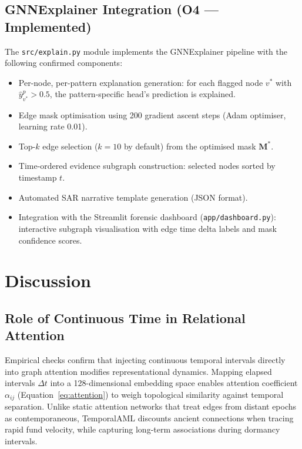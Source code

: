 \subsection{GNNExplainer Integration (O4 — Implemented)}

The \texttt{src/explain.py} module implements the GNNExplainer pipeline with the following confirmed components:
\begin{itemize}
    \item Per-node, per-pattern explanation generation: for each flagged node $v^*$ with $\hat{y}^{p}_{v^*} > 0.5$, the pattern-specific head's prediction is explained.
    \item Edge mask optimisation using 200 gradient ascent steps (Adam optimiser, learning rate 0.01).
    \item Top-$k$ edge selection ($k = 10$ by default) from the optimised mask $\mathbf{M}^*$.
    \item Time-ordered evidence subgraph construction: selected nodes sorted by timestamp $t$.
    \item Automated SAR narrative template generation (JSON format).
    \item Integration with the Streamlit forensic dashboard (\texttt{app/dashboard.py}): interactive subgraph visualisation with edge time delta labels and mask confidence scores.
\end{itemize}


\section{Discussion}
\label{sec:discussion}

\subsection{Role of Continuous Time in Relational Attention}

Empirical checks confirm that injecting continuous temporal intervals directly into graph attention modifies representational dynamics. Mapping elapsed intervals $\Delta t$ into a 128-dimensional embedding space enables attention coefficient $\alpha_{ij}$ (Equation~\ref{eq:attention}) to weigh topological similarity against temporal separation. Unlike static attention networks that treat edges from distant epochs as contemporaneous, TemporalAML discounts ancient connections when tracing rapid fund velocity, while capturing long-term associations during dormancy intervals.

